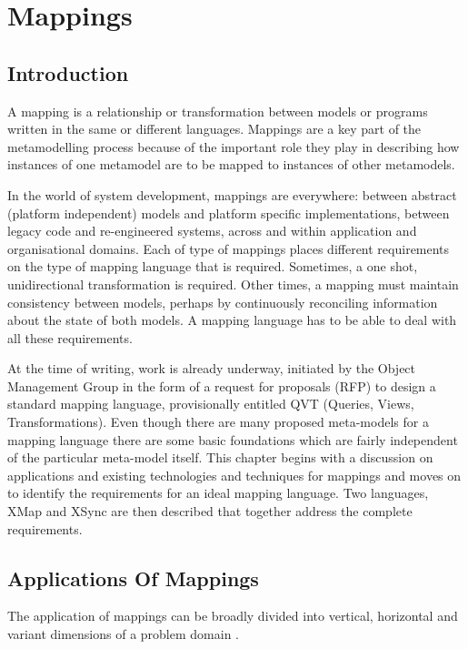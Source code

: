 \chapter{Mappings} \label{mappingchapter}

\section{Introduction}

A mapping is a relationship or transformation between models or
programs written in the same or different languages. Mappings are
a key part of the metamodelling process because of the important
role they play in describing how instances of one metamodel are to
be mapped to instances of other metamodels.

In the world of system development, mappings are everywhere:
between abstract (platform independent) models and platform
specific implementations, between legacy code and re-engineered
systems, across and within application and organisational domains.
Each of type of mappings places different requirements on the type
of mapping language that is required. Sometimes, a one shot,
unidirectional transformation is required. Other times, a mapping
must maintain consistency between models, perhaps by continuously
reconciling information about the state of both models. A mapping
language has to be able to deal with all these requirements.

At the time of writing, work is already underway, initiated by the
Object Management Group in the form of a request for proposals
(RFP) \cite{qvtrfp} to design a standard mapping language,
provisionally entitled QVT (Queries, Views, Transformations). Even
though there are many proposed meta-models for a mapping language
there are some basic foundations which are fairly independent of
the particular meta-model itself. This chapter begins with a
discussion on applications and existing technologies and
techniques for mappings and moves on to identify the requirements
for an ideal mapping language. Two languages, XMap and XSync are
then described that together address the complete requirements.

\section{Applications Of Mappings}

The application of mappings can be broadly divided into vertical,
horizontal and variant dimensions of a problem domain
\cite{mdatech}.

